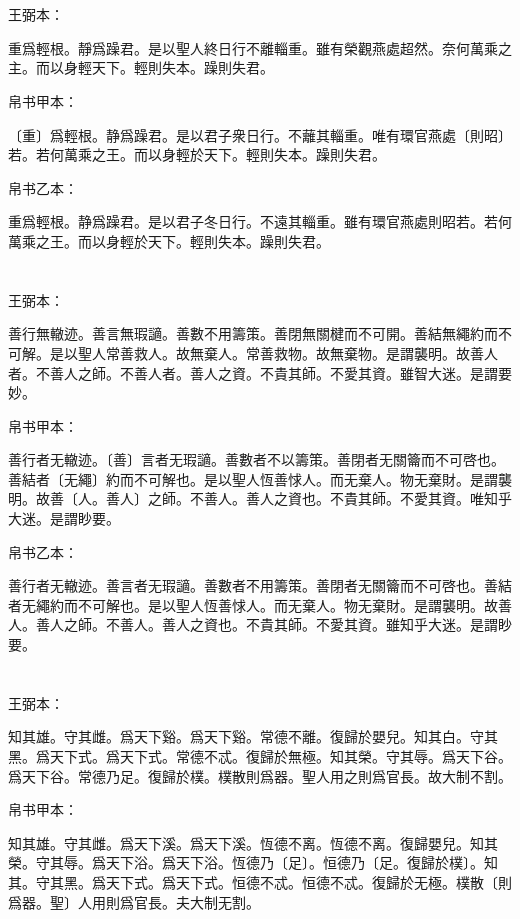 \documentclass[a5paper]{ctexbook}
\begin{document}
    \chapter{}
    王弼本：

    重爲輕根。靜爲躁君。是以聖人終日行不離輜重。雖有榮觀燕處超然。奈何萬乘之主。而以身輕天下。輕則失本。躁則失君。

    
    帛书甲本：

    〔重〕爲輕根。静爲躁君。是以君子衆日行。不蘺其輜重。唯有環官燕處〔則昭〕若。若何萬乘之王。而以身輕於天下。輕則失本。躁則失君。

    帛书乙本：

    重爲輕根。静爲躁君。是以君子冬日行。不遠其輜重。雖有環官燕處則昭若。若何萬乘之王。而以身輕於天下。輕則失本。躁則失君。

    \chapter{}
    王弼本：

    善行無轍迹。善言無瑕讁。善數不用籌策。善閉無關楗而不可開。善結無繩約而不可解。是以聖人常善救人。故無棄人。常善救物。故無棄物。是謂襲明。故善人者。不善人之師。不善人者。善人之資。不貴其師。不愛其資。雖智大迷。是謂要妙。

    
    帛书甲本：

    善行者无轍迹。〔善〕言者无瑕讁。善數者不以籌策。善閉者无關籥而不可啓也。善結者〔无繩〕約而不可解也。是以聖人恆善㤹人。而无棄人。物无棄財。是謂襲明。故善〔人。善人〕之師。不善人。善人之資也。不貴其師。不愛其資。唯知乎大迷。是謂眇要。

    帛书乙本：

    善行者无轍迹。善言者无瑕讁。善數者不用籌策。善閉者无關籥而不可啓也。善結者无繩約而不可解也。是以聖人恆善㤹人。而无棄人。物无棄財。是謂襲明。故善人。善人之師。不善人。善人之資也。不貴其師。不愛其資。雖知乎大迷。是謂眇要。

    \chapter{}
    王弼本：

    知其雄。守其雌。爲天下谿。爲天下谿。常德不離。復歸於嬰兒。知其白。守其黑。爲天下式。爲天下式。常德不忒。復歸於無極。知其榮。守其辱。爲天下谷。爲天下谷。常德乃足。復歸於樸。樸散則爲器。聖人用之則爲官長。故大制不割。

    
    帛书甲本：

    知其雄。守其雌。爲天下溪。爲天下溪。恆德不离。恆德不离。復歸嬰兒。知其榮。守其辱。爲天下浴。爲天下浴。恆德乃〔足〕。恒德乃〔足。復歸於樸〕。知其。守其黑。爲天下式。爲天下式。恒德不忒。恒德不忒。復歸於无極。樸散〔則爲器。聖〕人用則爲官長。夫大制无割。
\end{document}
